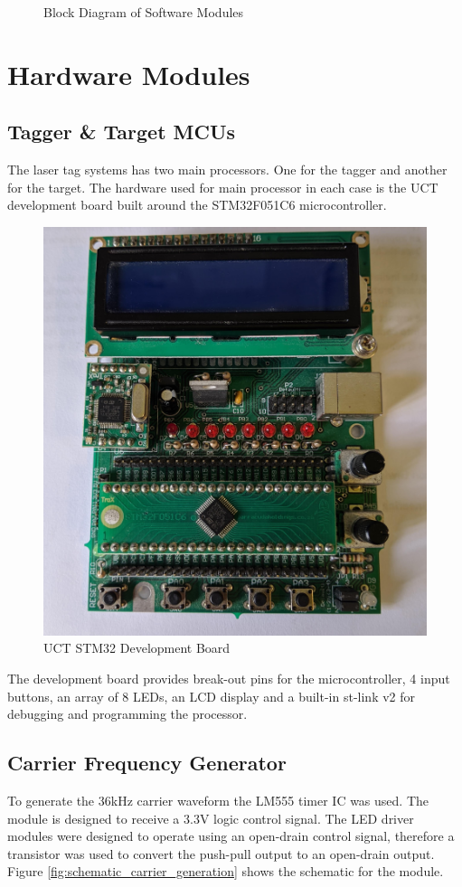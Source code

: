 \begin{figure}[H]
	\centering
	\caption{Block Diagram of Software Modules}
	\label{fig:system_overview_software}
\end{figure}



\section{Hardware Modules}

\subsection{Tagger \& Target MCUs}
The laser tag systems has two main processors. One for the tagger and another for the target. The hardware used for main processor in each case is the UCT development board built around the STM32F051C6 microcontroller.

\begin{figure}[H]
	\centering
	\includegraphics[width=.5\textwidth]{figures/design/dev_board_image.jpg}
	\caption{UCT STM32 Development Board}
	\label{fig:stm32_dev_board}
\end{figure}

The development board provides break-out pins for the microcontroller, 4 input buttons, an array of 8 LEDs, an LCD display and a built-in st-link v2 for debugging and programming the processor. 


\subsection{Carrier Frequency Generator}
To generate the 36kHz carrier waveform the LM555 timer IC was used. The module is designed to receive a 3.3V logic control signal. The LED driver modules were designed to operate using an open-drain control signal, therefore a transistor was used to convert the push-pull output to an open-drain output. Figure \ref{fig:schematic_carrier_generation} shows the schematic for the module.


